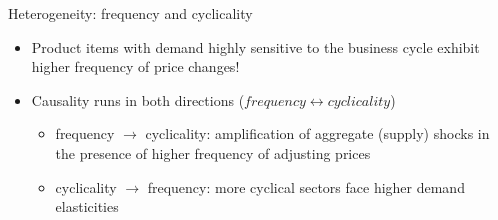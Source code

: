 \documentclass{beamer}
\begin{document}
\begin{frame}{Heterogeneity: frequency and cyclicality}

\begin{itemize}
\small
\item Product items with demand highly sensitive to the business cycle exhibit higher frequency of price changes!
\item Causality runs in both directions ($frequency \leftrightarrow cyclicality$)
\begin{itemize}
\item frequency $\rightarrow$ cyclicality: amplification of aggregate (supply) shocks in the presence of higher frequency of adjusting prices
\item cyclicality $\rightarrow$ frequency: more cyclical sectors face higher demand elasticities
\end{itemize}
\end{itemize}

\begin{center}

\begin{figure}[h!]

\end{figure}

\end{center}

\end{frame}
\end{document}
